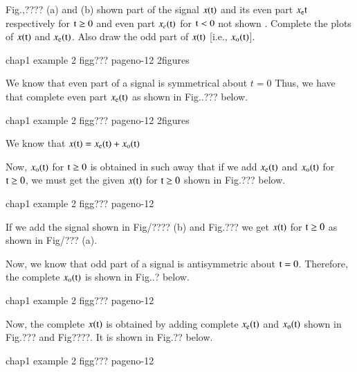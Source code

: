 \begin{exam*}
Fig.,????  (a) and (b) shown part of the signal $x(\textrm{t})$ and its even part $x_{\textrm{e}}\textrm{t}$ respectively for $\textrm{t} \geq 0$  and even part $x_{e}(\textrm{t})$ for $\textrm{t} < 0$ not shown . Complete the plots of $x(\textrm{t})$ and $x_{\textrm{e}}(\textrm{t})$. Also draw the odd part of $x(\textrm{t})$ [i.e., $x_{\textrm{o}}(\textrm{t})$].
\begin{center}
chap1 example 2 figg??? pageno-12 {2figures}
\end{center} 
\end{exam*}
\begin{solution}
We know that even part of a signal is symmetrical about $t=0$ Thus, we have that complete even part $x_{\textrm{e}}(\textrm{t})$ as shown in Fig..??? below.
\begin{center}
chap1 example 2 figg??? pageno-12 {2figures}
\end{center} 

We know that $x(\textrm{t}) = x_{\textrm{e}}(\textrm{t})+ x_{\textrm{o}}(\textrm{t})$

Now, $x_{\textrm{o}}(\textrm{t})$ for $\textrm{t} \geq 0$ is obtained in such away that if we add $x_{\textrm{e}}(\textrm{t})$ and $x_{\textrm{o}}(\textrm{t})$ for $\textrm{t} \geq 0$, we must get the given $x(\textrm{t})$ for $\textrm{t}\geq 0$ shown in Fig.??? below.
\begin{center}
chap1 example 2 figg??? pageno-12 
\end{center} 

If we add the signal shown in Fig/???? (b) and Fig.??? we get $x(\textrm{t})$ for $\textrm{t} \geq 0$ as shown in Fig/??? (a).

Now, we know that odd part of a signal is antisymmetric about $\textrm{t}=0$. Therefore, the complete $x_{\textrm{o}}(\textrm{t})$ is shown in Fig..? below.
\begin{center}
chap1 example 2 figg??? pageno-12 
\end{center} 

Now, the complete $x(\textrm{t})$ is obtained by adding complete $x_{\textrm{e}}(\textrm{t})$ and $x_{\textrm{o}}(\textrm{t})$ shown in Fig.??? and Fig????. It is shown in Fig.?? below.
\begin{center}
chap1 example 2 figg??? pageno-12 
\end{center} 
\end{solution}

